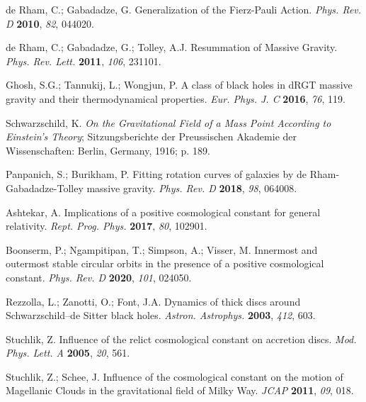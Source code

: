 \documentclass[aps,amsmath,amssymb,twocolumn]{revtex4}
\begin{document}
\begin{thebibliography}{999}
 de Rham, C.; Gabadadze, G. 
Generalization of the Fierz-Pauli Action.
\emph{Phys. Rev. D} \textbf{2010}, \emph{82}, 044020.

 de Rham, C.; Gabadadze, G.; Tolley, A.J. 
Resummation of Massive Gravity.
\emph{Phys. Rev. Lett.} \textbf{2011}, \emph{106},  231101.

 Ghosh, S.G.;
 Tannukij, L.; Wongjun, P. 
A class of black holes in dRGT massive gravity and their thermodynamical properties.
\emph{Eur. Phys. J. C} \textbf{2016}, \emph{76},   119.

 Schwarzschild, K.  \emph{On the Gravitational Field of a Mass Point According to Einstein's Theory}; Sitzungsberichte der Preussischen Akademie der Wissenschaften: Berlin, Germany, 
  {1916}; p. 189. %

 Panpanich, S.; Burikham, P. 
Fitting rotation curves of galaxies by de Rham-Gabadadze-Tolley massive gravity.
\emph{Phys. Rev. D} \textbf{2018}, \emph{98},   064008.


 Ashtekar, A. 
Implications of a positive cosmological constant for general relativity.
\emph{Rept. Prog. Phys.} \textbf{2017}, \emph{80},   102901.

 Boonserm, P.; Ngampitipan, T.; Simpson, A.; Visser, M.  
Innermost and outermost stable circular orbits in the presence of a positive cosmological constant.
\emph{Phys. Rev. D} \textbf{2020},  \emph{101}, 024050.

 Rezzolla, L.; Zanotti, O.; Font, J.A.  
Dynamics of thick discs around Schwarzschild--de Sitter black holes.
\emph{Astron. Astrophys.} \textbf{2003}, \emph{412}, 603.

 Stuchlik, Z. 
Influence of the relict cosmological constant on accretion discs.
\emph{Mod. Phys. Lett. A}  \textbf{2005}, \emph{20}, 561.


 Stuchlik, Z.; Schee, J. 
Influence of the cosmological constant on the motion of Magellanic Clouds in the gravitational field of Milky Way.
\emph{JCAP} \textbf{2011}, \emph{09},  018.


\end{thebibliography}
\end{document}

